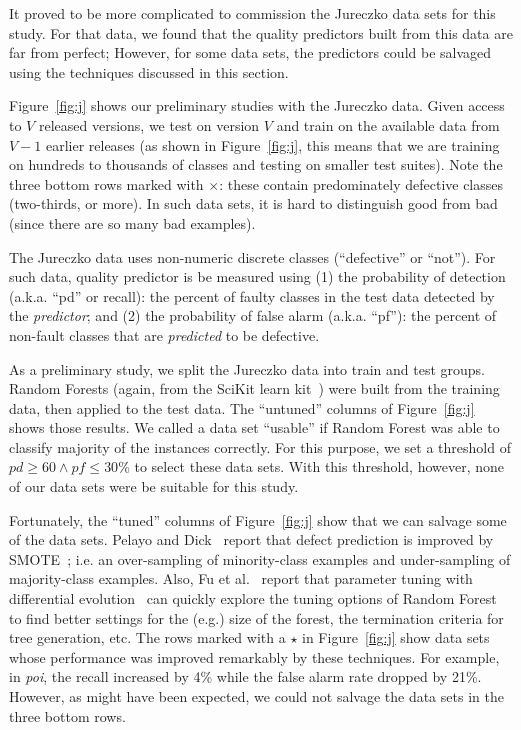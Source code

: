 \documentclass{sig-alternate}
\newcommand{\fig}[1]{Figure~\ref{fig:#1}}
\begin{document}
 It proved to be  more complicated to commission the Jureczko data sets for this study.
 For that data, we found that the
 quality predictors built from this data are far from perfect;
However, for some data sets, the  predictors could
be salvaged using the techniques discussed in this section.

 \fig{j} shows our preliminary studies with the Jureczko   data.
Given access to $V$ released
versions, we test on version $V$ and train on the available data from $V-1$ earlier releases (as
shown in \fig{j}, this means that we are training on hundreds to thousands
of classes and testing on smaller test suites).
Note the   \colorbox{lavenderpink}{three bottom rows}   marked with $\times$: these contain predominately defective classes (two-thirds, or more).  In such data sets, it is hard to distinguish good from bad (since there are so many bad examples). 


The  Jureczko data uses non-numeric discrete classes (``defective'' or ``not'').
For such data, quality predictor   is be measured using
(1) the  probability of detection (a.k.a. ``pd'' or recall):  the percent of faulty classes in
the test data detected
by the {\em predictor}; and (2) the 
probability of false alarm (a.k.a. ``pf''): the percent of non-fault
classes that are {\em predicted} to be defective.

As a preliminary study, we split the Jureczko  data into train and test groups.
Random Forests (again, from the SciKit learn kit~\cite{Pedregosa2012}) were
built from the training data, then applied to the test data.
The ``untuned'' columns of \fig{j} shows those results. We called a data set ``usable'' if Random Forest was able to classify majority of the instances correctly. For this purpose, we set a threshold of $\mathit{pd}\ge 60 \wedge \mathit{pf} \le 30$\% to select these data sets. With this threshold, however, none of our data sets were be suitable for this study.

Fortunately, the ``tuned'' columns of \fig{j} show that we can salvage some of the data sets. Pelayo and Dick~\cite{pelayo07} report that defect prediction is improved by SMOTE~\cite{Chawla2002}; i.e. an over-sampling of minority-class examples and under-sampling of majority-class examples. Also, Fu et al.~\cite{fu:ase15} report that parameter tuning with differential evolution~\cite{storn97} can quickly explore the tuning options of Random Forest to find better settings for the (e.g.) size of the forest, the termination criteria
for tree generation, etc. The rows \colorbox{celadon}{marked with a $\star$} in \fig{j} show data sets whose performance was improved remarkably by these techniques. For example, in {\em poi}, the recall increased by 4\% while the false alarm rate dropped by 21\%. However,  as might have been expected, we could not salvage the data sets in the  three bottom rows.
\end{document}
